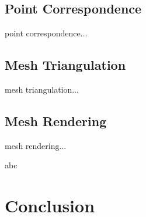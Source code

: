 \documentclass[acmsmall]{acmart}
\begin{document}
\subsection{Point Correspondence}
point correspondence...

\subsection{Mesh Triangulation}
mesh triangulation...

\subsection{Mesh Rendering}
mesh rendering...

abc \cite{mackay2019robust}

\section{Conclusion}



\end{document}
